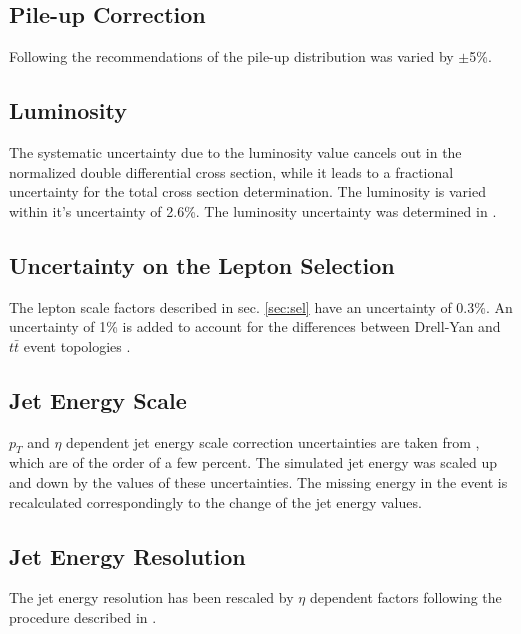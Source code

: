 \subsection{Pile-up Correction}

Following the recommendations of \cite{TWikiSystPU} the
pile-up distribution was varied by $\pm$5\%.

\subsection{Luminosity}

The systematic uncertainty due to the luminosity value cancels out in the normalized double differential cross section,
while it leads to a fractional uncertainty for the total cross section determination. The luminosity is varied within it's uncertainty of 2.6\%. 
The luminosity uncertainty was determined in \cite{CMS-PAS-LUM-13-001}.

\subsection{Uncertainty on the Lepton Selection}

The lepton scale factors described in sec. \ref{sec:sel} have an uncertainty of 0.3\%\cite{Asin2014Auth}. An uncertainty of 1\% is added to account for
the differences between Drell-Yan and $t\bar{t}$ event topologies \cite{AN-2012-389}.

\subsection{Jet Energy Scale}

$p_{T}$ and $\eta$ dependent jet energy scale correction uncertainties are taken from \cite{CMS-PAS-JME-10-010}, which are of the
order of a few percent. The simulated jet energy was scaled up and down by the values of these uncertainties. The missing energy in the 
event is recalculated correspondingly to the change of the jet energy values.

\subsection{Jet Energy Resolution}

The jet energy resolution has been rescaled by $\eta$ dependent factors following the procedure described in \cite{TWikiSystJER}.

